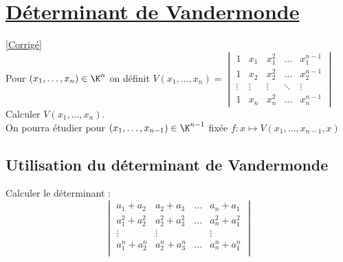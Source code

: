 \documentclass[8pt]{book}
\begin{document}
	\section{\underline{Déterminant de Vandermonde}}
	\label{Déterminant de Vandermonde}
	\textcolor{blue}{\hyperref[Déterminant de Vandermonde corrigé]{[Corrigé]}}\\
	Pour $(x_1,\dots,x_n)\in \K^n$ on définit $V(x_1,\dots,x_n)=
	\begin{vmatrix}
		1     &x_1   &x_1^2 &\dots &x_1^{n-1}\\
		1     &x_2   &x_2^2 &\dots &x_2^{n-1}\\
		\vdots&\vdots&\vdots&\ddots&\vdots\\
		1     &x_n   &x_n^2 &\dots &x_n^{n-1}
	\end{vmatrix}$\\
	Calculer $V(x_1,\dots,x_n)$.\\
	On pourra étudier pour $(x_1,\dots,x_{n-1})\in \K^{n-1}$ fixée $f: x\longmapsto V(x_1,\dots,x_{n-1},x)$
	\subsection{Utilisation du déterminant de Vandermonde}
	Calculer le déterminant : $$\begin{vmatrix}
		a_1+a_2 & a_2+a_3&\dots &a_n+a_1\\
		a_1^2+a_2^2 & a_2^2+a_3^2&\dots &a_n^2+a_1^2\\
		\vdots & \vdots & &\vdots\\
		a_1^n+a_2^n & a_2^n+a_3^n&\dots &a_n^n+a_1^n\\
	\end{vmatrix}$$
	
\end{document}
